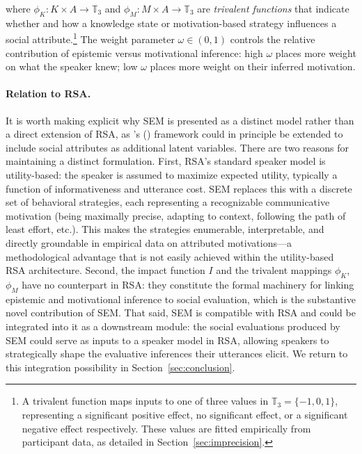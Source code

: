 \documentclass[12pt,a4paper]{article}
\begin{document}
\noindent where $\phi_K: K \times A \rightarrow \mathbb{T}_3$ and
$\phi_M: M \times A \rightarrow \mathbb{T}_3$ are \emph{trivalent functions}
that indicate whether and how a knowledge state or motivation-based strategy
influences a social attribute.\footnote{A trivalent function maps inputs to one
of three values in $\mathbb{T}_3 = \{-1, 0, 1\}$, representing a significant
positive effect, no significant effect, or a significant negative effect
respectively. These values are fitted empirically from participant data, as
detailed in Section~\ref{sec:imprecision}.} The weight parameter $\omega \in
(0,1)$ controls the relative contribution of epistemic versus motivational
inference: high $\omega$ places more weight on what the speaker knew; low
$\omega$ places more weight on their inferred motivation.

\paragraph{Relation to RSA.}
It is worth making explicit why SEM is presented as a distinct model rather than
a direct extension of RSA, as \citeauthor{frank2012}'s (\citeyear{frank2012})
framework could in principle be extended to include social attributes as
additional latent variables. There are two reasons for maintaining a distinct
formulation. First, RSA's standard speaker model is utility-based: the speaker
is assumed to maximize expected utility, typically a function of informativeness
and utterance cost. SEM replaces this with a discrete set of behavioral
strategies, each representing a recognizable communicative motivation (being
maximally precise, adapting to context, following the path of least effort,
etc.). This makes the strategies enumerable, interpretable, and directly
groundable in empirical data on attributed motivations---a methodological
advantage that is not easily achieved within the utility-based RSA architecture.
Second, the impact function $I$ and the trivalent mappings $\phi_K$, $\phi_M$
have no counterpart in RSA: they constitute the formal machinery for linking
epistemic and motivational inference to social evaluation, which is the
substantive novel contribution of SEM. That said, SEM is compatible with RSA and
could be integrated into it as a downstream module: the social evaluations
produced by SEM could serve as inputs to a speaker model in RSA, allowing
speakers to strategically shape the evaluative inferences their utterances
elicit. We return to this integration possibility in
Section~\ref{sec:conclusion}.
\end{document}
